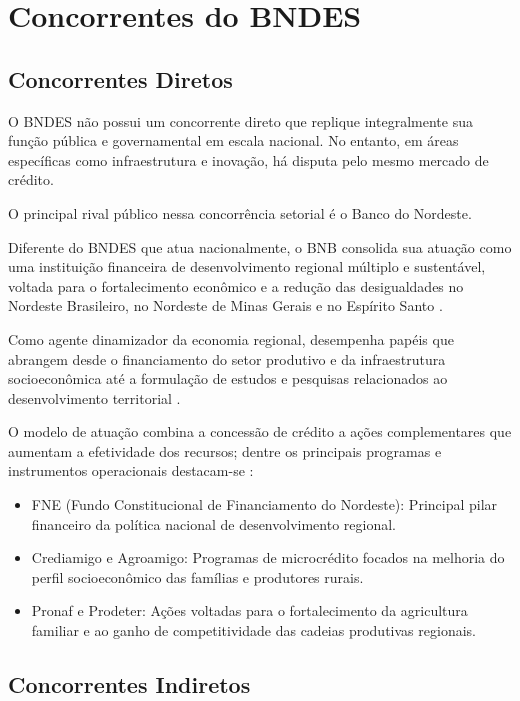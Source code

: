 \chapter{Concorrentes do BNDES}

\section{Concorrentes Diretos}

O BNDES não possui um concorrente direto que replique integralmente sua função pública e governamental em escala nacional. No entanto, em áreas específicas como infraestrutura e inovação, há disputa pelo mesmo mercado de crédito. 

O principal rival público nessa concorrência setorial é o Banco do Nordeste.

Diferente do BNDES que atua nacionalmente, o BNB consolida sua atuação como uma instituição financeira de desenvolvimento regional múltiplo e sustentável, voltada para o fortalecimento econômico e a redução das desigualdades no Nordeste Brasileiro, no Nordeste de Minas Gerais e no Espírito Santo \cite{bnb_portal}.

Como agente dinamizador da economia regional, desempenha papéis que abrangem desde o financiamento do setor produtivo e da infraestrutura socioeconômica até a formulação de estudos e pesquisas relacionados ao desenvolvimento territorial \cite{bnb_portal}.

O modelo de atuação combina a concessão de crédito a ações complementares que aumentam a efetividade dos recursos; dentre os principais programas e instrumentos operacionais destacam-se \cite{bnb_portal}:

\begin{itemize}

\item FNE (Fundo Constitucional de Financiamento do Nordeste): Principal pilar financeiro da política nacional de desenvolvimento regional.
\item Crediamigo e Agroamigo: Programas de microcrédito focados na melhoria do perfil socioeconômico das famílias e produtores rurais.
\item Pronaf e Prodeter: Ações voltadas para o fortalecimento da agricultura familiar e ao ganho de competitividade das cadeias produtivas regionais.

\end{itemize}

\section{Concorrentes Indiretos}

